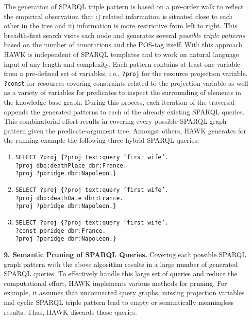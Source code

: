 The generation of SPARQL triple pattern is based on a pre-order walk to reflect the empirical observation that i) related information is situated close to each other in the tree and ii) information is more restrictive from left to right.
This breadth-first search visits each node and generates several \emph{possible triple patterns} based on the number of annotations and the POS-tag itself. 
With this approach HAWK is independent of SPARQL templates and to work on natural language input of any length and complexity.
Each pattern contains at least one variable from a pre-defined set of variables, i.e., \texttt{?proj} for the resource projection variable, \texttt{?const} for resources covering 
constraints related to the projection variable as well as a variety of variables for predicates to inspect the surrounding of elements in the knowledge base graph. 
During this process, each iteration of the traversal appends the generated patterns to each of the already existing SPARQL queries. 
This combinatorial effort results in covering every possible SPARQL graph pattern given the predicate-argument tree.
Amongst others, HAWK generates for the running example the following three hybrid SPARQL queries:
\begin{enumerate}
\item \texttt{SELECT ?proj  \{?proj text:query 'first wife'.\\ ?proj dbo:deathPlace dbr:France.\\ ?proj ?pbridge dbr:Napoleon.\}}
\item \texttt{SELECT ?proj  \{?proj text:query 'first wife'.\\ ?proj dbo:deathDate dbr:France.\\ ?proj ?pbridge dbr:Napoleon.\}}
\item \texttt{SELECT ?proj  \{?proj text:query 'first wife'.\\ ?const pbridge dbr:France.\\ ?proj ?pbridge dbr:Napoleon.\}}
\end{enumerate}

\textbf{9. Semantic Pruning of SPARQL Queries.}
Covering each possible SPARQL graph pattern with the above algorithm results in a large number of generated SPARQL queries.
To effectively handle this large set of queries and reduce the computational effort, HAWK implements various methods for pruning. 
For example, it assumes that unconnected query graphs, missing projection variables and cyclic SPARQL triple pattern lead to empty or semantically meaningless results.
Thus, HAWK discards those queries.

